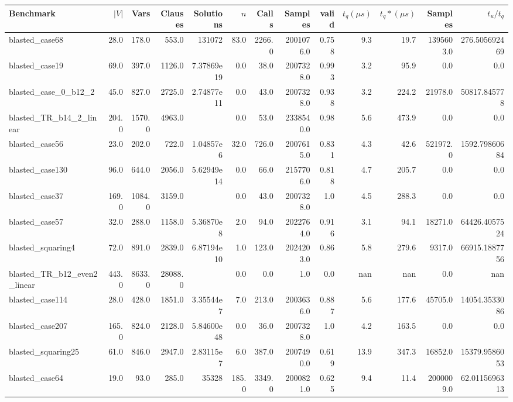 \begin{tabular}{|l r r r r| r r r r r r | r r|}
\hline
Benchmark & $|V|$ & Vars & Clauses & Solutions & $n$ & Calls & Samples & valid & $t_q (\mu s)$ & $t_q* (\mu s)$ & Samples & $t_u/t_q$ \\
\hline
blasted\_case68 & 28.0 & 178.0 & 553.0 & 131072 & 83.0 & 2266.0 & 2001076.0 & 0.758 & 9.3 & 19.7 & 1395603.0 & 276.505692469 \\
\hline
blasted\_case19 & 69.0 & 397.0 & 1126.0 & 7.37869e19 & 0.0 & 38.0 & 2007328.0 & 0.993 & 3.2 & 95.9 & 0.0 & 0.0 \\
\hline
blasted\_case\_0\_b12\_2 & 45.0 & 827.0 & 2725.0 & 2.74877e11 & 0.0 & 43.0 & 2007328.0 & 0.938 & 3.2 & 224.2 & 21978.0 & 50817.845778 \\
\hline
blasted\_TR\_b14\_2\_linear & 204.0 & 1570.0 & 4963.0 &  & 0.0 & 53.0 & 2338540.0 & 0.98 & 5.6 & 473.9 & 0.0 & 0.0 \\
\hline
blasted\_case56 & 23.0 & 202.0 & 722.0 & 1.04857e6 & 32.0 & 726.0 & 2007615.0 & 0.831 & 4.3 & 42.6 & 521972.0 & 1592.79860684 \\
\hline
blasted\_case130 & 96.0 & 644.0 & 2056.0 & 5.62949e14 & 0.0 & 66.0 & 2157706.0 & 0.818 & 4.7 & 205.7 & 0.0 & 0.0 \\
\hline
blasted\_case37 & 169.0 & 1084.0 & 3159.0 &  & 0.0 & 43.0 & 2007328.0 & 1.0 & 4.5 & 288.3 & 0.0 & 0.0 \\
\hline
blasted\_case57 & 32.0 & 288.0 & 1158.0 & 5.36870e8 & 2.0 & 94.0 & 2022764.0 & 0.916 & 3.1 & 94.1 & 18271.0 & 64426.4057524 \\
\hline
blasted\_squaring4 & 72.0 & 891.0 & 2839.0 & 6.87194e10 & 1.0 & 123.0 & 2024203.0 & 0.86 & 5.8 & 279.6 & 9317.0 & 66915.1887756 \\
\hline
blasted\_TR\_b12\_even2\_linear & 443.0 & 8633.0 & 28088.0 &  & 0.0 & 0.0 & 1.0 & 0.0 & nan & nan & 0.0 & nan \\
\hline
blasted\_case114 & 28.0 & 428.0 & 1851.0 & 3.35544e7 & 7.0 & 213.0 & 2003636.0 & 0.887 & 5.6 & 177.6 & 45705.0 & 14054.3533086 \\
\hline
blasted\_case207 & 165.0 & 824.0 & 2128.0 & 5.84600e48 & 0.0 & 36.0 & 2007328.0 & 1.0 & 4.2 & 163.5 & 0.0 & 0.0 \\
\hline
blasted\_squaring25 & 61.0 & 846.0 & 2947.0 & 2.83115e7 & 6.0 & 387.0 & 2007490.0 & 0.619 & 13.9 & 347.3 & 16852.0 & 15379.9586053 \\
\hline
blasted\_case64 & 19.0 & 93.0 & 285.0 & 35328 & 185.0 & 3349.0 & 2000821.0 & 0.625 & 9.4 & 11.4 & 2000009.0 & 62.0115696313 \\

\end{tabular}
